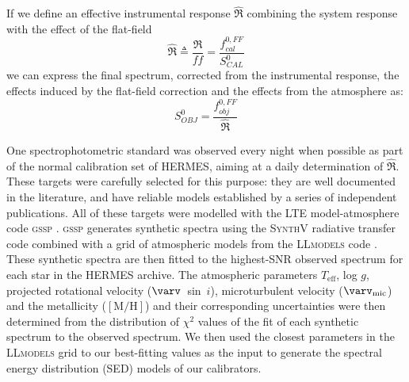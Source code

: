If we define an effective instrumental response $\hat{\Re}$ combining the system response with the effect of the flat-field
\begin{equation}
    \label{eqn:hatre}
    \hat{\Re} \triangleq \frac{\Re}{ff} = \frac{f^{0,FF}_{cal}}{S^0_{CAL}}
\end{equation}
we can express the final spectrum, corrected from the instrumental response, the effects induced by the flat-field correction and the effects from the atmosphere as:
\begin{equation}
\label{eqn:Sfinal}
S^0_{OBJ} = \frac{f^{0,FF}_{obj}}{\hat{\Re}}
\end{equation}


One spectrophotometric standard was observed every night when possible as part of the normal calibration set of HERMES, aiming at a daily determination of $\hat{\Re}$. These targets were carefully selected for this purpose: they are well documented in the literature, and have reliable models established by a series of independent publications. All of these targets were modelled with the LTE model-atmosphere code \textsc{gssp} \citep{tkachenko_grid_2015}. \textsc{gssp} generates synthetic spectra using the \textsc{SynthV} radiative transfer code \citep{tsymbal_starsp_1996} combined with a grid of atmospheric models from the \textsc{LLmodels} code \citep{shulyak_line-by-line_2004}. These synthetic spectra are then fitted to the highest-SNR observed spectrum for each star in the HERMES archive. The atmospheric parameters $T_{\text{eff}}$, log $g$, projected rotational velocity ($\varv$~sin~$i$), microturbulent velocity ($\varv_{\text{mic}}$) and the metallicity ($\mathrm{[M/H]}$) and their corresponding uncertainties were then determined from the distribution of $\chi^{2}$ values of the fit of each synthetic spectrum to the observed spectrum. We then used the closest parameters in the \textsc{LLmodels} grid to our best-fitting values as the input to generate the spectral energy distribution (SED) models of our calibrators. 

